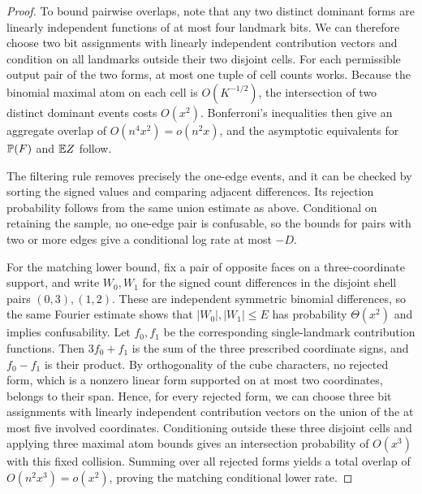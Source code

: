 \begin{proof}
To bound pairwise overlaps, note that any two distinct dominant forms are
linearly independent functions of at most four landmark bits. We can therefore
choose two bit assignments with linearly independent contribution vectors and
condition on all landmarks outside their two disjoint cells. For each
permissible output pair of the two forms, at most one tuple of cell counts
works. Because the binomial maximal atom on each cell is \(O(K^{-1/2})\), the
intersection of two distinct dominant events costs \(O(x^2)\). Bonferroni's
inequalities then give an aggregate overlap of \(O(n^4x^2)=o(n^2x)\), and the
asymptotic equivalents for \(\mathbb P(F)\) and \(\mathbb E Z\) follow.

The filtering rule removes precisely the one-edge events, and it can be checked
by sorting the signed values and comparing adjacent differences. Its rejection
probability follows from the same union estimate as above. Conditional on
retaining the sample, no one-edge pair is confusable, so the bounds for pairs
with two or more edges give a conditional log rate at most \(-D\).

For the matching lower bound, fix a pair of opposite faces on a
three-coordinate support, and write \(W_0,W_1\) for the signed count
differences in the disjoint shell pairs \((0,3),(1,2)\). These are independent
symmetric binomial differences, so the same Fourier estimate shows that
\(|W_0|,|W_1|\le E\) has probability \(\Theta(x^2)\) and implies confusability.
Let \(f_0,f_1\) be the corresponding single-landmark contribution functions.
Then \(3f_0+f_1\) is the sum of the three prescribed coordinate signs, and
\(f_0-f_1\) is their product. By orthogonality of the cube characters, no
rejected form, which is a nonzero linear form supported on at most two
coordinates, belongs to their span. Hence, for every rejected form, we can
choose three bit assignments with linearly independent contribution vectors on
the union of the at most five involved coordinates. Conditioning outside these
three disjoint cells and applying three maximal atom bounds gives an
intersection probability of \(O(x^3)\) with this fixed collision. Summing over
all rejected forms yields a total overlap of \(O(n^2x^3)=o(x^2)\), proving the
matching conditional lower rate.
\end{proof}
